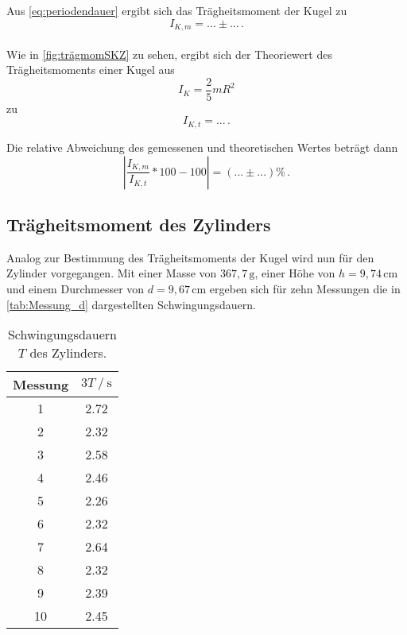 Aus \eqref{eq:periodendauer} ergibt sich das Trägheitsmoment der Kugel zu
\begin{equation*}
  I_{K,m} = ... \pm ... \,.
\end{equation*} \\

Wie in \autoref{fig:trägmomSKZ} zu sehen, ergibt sich der Theoriewert des Trägheitsmoments einer Kugel aus
\begin{equation}
  I_{K} = \frac{2}{5} m R^2
  \label{trägheitsmomK}
\end{equation}
zu
\begin{equation*}
  I_{K,t} = ... \,.
\end{equation*}

Die relative Abweichung des gemessenen und theoretischen Wertes beträgt dann
\begin{equation*}
  \left|\frac{I_{K,m}}{I_{K,t}} * 100 - 100 \right| = (... \pm ...) \% \,.
\end{equation*}



\subsection{Trägheitsmoment des Zylinders}
\label{subsec:d}

Analog zur Bestimmung des Trägheitsmoments der Kugel wird nun für den Zylinder vorgegangen. Mit einer Masse von $367,7 \,\unit{\gram}$, einer Höhe von $h = 9,74 \,\unit{\centi\meter}$
und einem Durchmesser von $d = 9,67 \,\unit{\centi\meter}$ ergeben sich für zehn Messungen die in \autoref{tab:Messung_d} dargestellten Schwingungsdauern.

\begin{table}[H] %
  \centering
  \begin{tabular}{S[table-format=2.0] S[table-format=1.2]}
      \toprule
      {Messung} & {$3T \mathbin{/} \unit{\second}$}\\
        & 2.72 \\
          2  & 2.32 \\
          3  & 2.58 \\
          4  & 2.46 \\  
          5  & 2.26 \\
          6  & 2.32 \\
          7  & 2.64 \\
          8  & 2.32 \\
          9  & 2.39 \\
          10 & 2.45 \\
      \bottomrule
  \end{tabular}
  \caption{Schwingungsdauern $T$ des Zylinders.}
  \label{tab:Messung_d}
\end{table}

